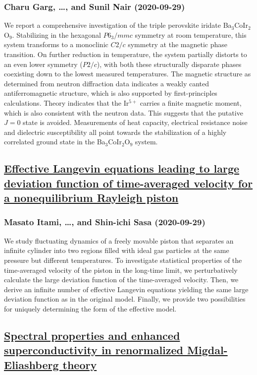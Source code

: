 \subsubsection*{Charu Garg, \dots, and Sunil Nair (2020-09-29)}
We report a comprehensive investigation of the triple perovskite iridate
Ba$_{3}$CoIr$_{2}$O$_{9}$. Stabilizing in the hexagonal $P6_{3}/mmc$ symmetry
at room temperature, this system transforms to a monoclinic $C2/c$ symmetry at
the magnetic phase transition. On further reduction in temperature, the system
partially distorts to an even lower symmetry ($P2/c$), with both these
structurally disparate phases coexisting down to the lowest measured
temperatures. The magnetic structure as determined from neutron diffraction
data indicates a weakly canted antiferromagnetic structure, which is also
supported by first-principles calculations. Theory indicates that the Ir$^{5+}$
carries a finite magnetic moment, which is also consistent with the neutron
data. This suggests that the putative $J=0$ state is avoided. Measurements of
heat capacity, electrical resistance noise and dielectric susceptibility all
point towards the stabilization of a highly correlated ground state in the
Ba$_{3}$CoIr$_{2}$O$_{9}$ system.

\subsection*{\href{http://arxiv.org/abs/2009.13785v1}{Effective Langevin equations leading to large deviation function of  time-averaged velocity for a nonequilibrium Rayleigh piston}}
\subsubsection*{Masato Itami, \dots, and Shin-ichi Sasa (2020-09-29)}
We study fluctuating dynamics of a freely movable piston that separates an
infinite cylinder into two regions filled with ideal gas particles at the same
pressure but different temperatures. To investigate statistical properties of
the time-averaged velocity of the piston in the long-time limit, we
perturbatively calculate the large deviation function of the time-averaged
velocity. Then, we derive an infinite number of effective Langevin equations
yielding the same large deviation function as in the original model. Finally,
we provide two possibilities for uniquely determining the form of the effective
model.

\subsection*{\href{http://arxiv.org/abs/2009.13776v1}{Spectral properties and enhanced superconductivity in renormalized  Migdal-Eliashberg theory}}
